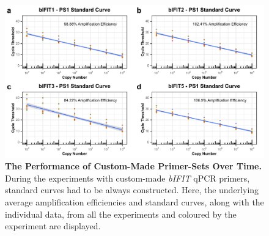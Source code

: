 \begin{figure}
    \centering
    \includegraphics[width=1\linewidth]{07. Chapter 2/Figs/01. Technologies/03. standard curves behaviour.pdf}
    \caption[The Performance of Custom-Made Primer-Sets Over Time.]{\textbf{The Performance of Custom-Made Primer-Sets Over Time.} During the experiments with custom-made \textit{bIFIT} qPCR primers, standard curves had to be always constructed. Here, the underlying average amplification efficiencies and standard curves, along with the individual data, from all the experiments and coloured by the experiment are displayed.}
    \label{The Performance of Custom-Made Primer-Sets Over Time}
\end{figure}


